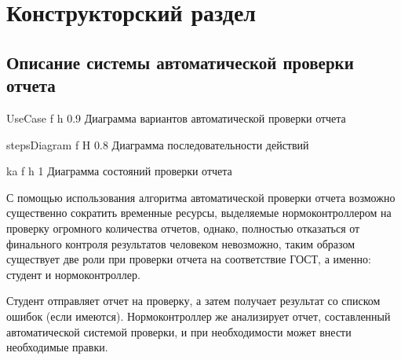 \chapter{Конструкторский раздел}

\section{Описание системы автоматической проверки отчета}

{UseCase} %
{f} %
{h} %
{0.9\textwidth} %
{Диаграмма вариантов автоматической проверки отчета} %

{stepsDiagram} %
{f} %
{H} %
{0.8\textwidth} %
{Диаграмма последовательности действий} %

{ka} %
{f} %
{h} %
{1\textwidth} %
{Диаграмма состояний проверки отчета} %

С помощью использования алгоритма автоматической проверки отчета возможно существенно сократить временные ресурсы, выделяемые нормоконтроллером на проверку огромного количества отчетов, однако, полностью отказаться от финального контроля результатов человеком невозможно, таким образом существует две роли при проверки отчета на соответствие ГОСТ, а именно: студент и нормоконтроллер.

Студент отправляет отчет на проверку, а затем получает результат со списком ошибок (если имеются). Нормоконтроллер же анализирует отчет, составленный автоматической системой проверки, и при необходимости может внести необходимые правки.
